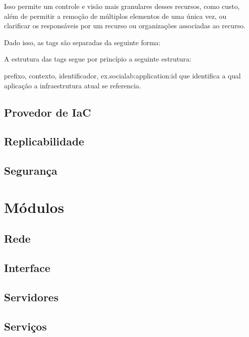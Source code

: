 \documentclass[12pt, a4paper]{report}
\begin{document}
Isso permite um controle e visão mais granulares desses recursos, como custo, além de permitir a remoção de múltiplos elementos de uma única vez, ou clarificar os responsáveis por um recurso ou organizações associadas ao recurso.

Dado isso, as tags são separadas da seguinte forma:


A estrutura das tags segue por princípio a seguinte estrutura:

prefixo, contexto, identificador, ex.socialab:application:id
que identifica a qual aplicação a infraestrutura atual se referencia.

\section{Provedor de IaC}
\section{Replicabilidade}
\section{Segurança}
\chapter{Módulos}

\section{Rede}
\section{Interface}
\section{Servidores}
\section{Serviços}
\end{document}
